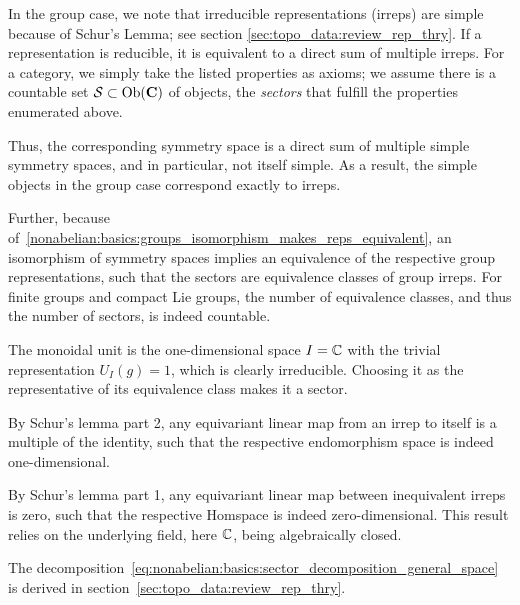 \clearpage
\begin{doublecol}
    In the group case, we note that irreducible representations (irreps) are simple because of Schur's Lemma; see section \ref{sec:topo_data:review_rep_thry}.
    If a representation is reducible, it is equivalent to a direct sum of multiple irreps.
\colswitch
    For a category, we simply take the listed properties as axioms; we assume there is a countable set $\mathcal{S} \subset \mathrm{Ob}(\mathbf{C})$ of objects, the \emph{sectors} that fulfill the properties enumerated above.
    
\end{doublecol}

\begin{extendleftcol}
    Thus, the corresponding symmetry space is a direct sum of multiple simple symmetry spaces, and in particular, not itself simple.
    As a result, the simple objects in the group case correspond exactly to irreps.
    
    Further, because of~\eqref{nonabelian:basics:groups_isomorphism_makes_reps_equivalent}, an isomorphism of symmetry spaces implies an equivalence of the respective group representations, such that the sectors are equivalence classes of group irreps.
    For finite groups and compact Lie groups, the number of equivalence classes, and thus the number of sectors, is indeed countable.

    The monoidal unit is the one-dimensional space $I = \mathbb{C}$ with the trivial representation $U_I(g) = 1$, which is clearly irreducible. Choosing it as the representative of its equivalence class makes it a sector.

    By Schur's lemma part 2, any equivariant linear map from an irrep to itself is a multiple of the identity, such that the respective endomorphism space is indeed one-dimensional.
    
    By Schur's lemma part 1, any equivariant linear map between inequivalent irreps is zero, such that the respective Homspace is indeed zero-dimensional.
    This result relies on the underlying field, here $\mathbb{C}$, being algebraically closed.

    The decomposition~\eqref{eq:nonabelian:basics:sector_decomposition_general_space} is derived in section~\ref{sec:topo_data:review_rep_thry}.
\end{extendleftcol}

